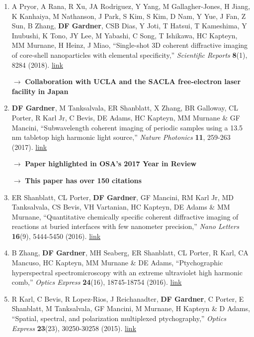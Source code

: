 \documentclass[letterpaper,12pt]{article}
\begin{document}
\begin{enumerate}[leftmargin=*]
	\item A Pryor, A Rana, R Xu, JA Rodriguez, Y Yang, M Gallagher-Jones, H Jiang, K Kanhaiya, M Nathanson, J Park, S Kim, S Kim, D Nam, Y Yue, J Fan, Z Sun, B Zhang, \textbf{DF Gardner}, CSB Dias, Y Joti, T Hatsui, T Kameshima, Y Inubushi, K Tono, JY Lee, M Yabashi, C Song, T Ishikawa, HC Kapteyn, MM Murnane, H Heinz, J Miao, ``Single-shot 3D coherent diffractive imaging of core-shell nanoparticles with elemental specificity,'' \emph{Scientific Reports} \textbf{8}(1), 8284 (2018). \href{https://doi.org/10.1038/s41598-018-26182-1}{link}
	
	\quad $\rightarrow$ \textbf{Collaboration with UCLA and the SACLA free-electron laser facility in Japan}
	
	\item \textbf{DF Gardner}, M Tanksalvala, ER Shanblatt, X Zhang, BR Galloway, CL Porter, R Karl Jr, C Bevis, DE Adams, HC Kapteyn, MM Murnane \& GF Mancini, ``Subwavelength coherent imaging of periodic samples using a 13.5 nm tabletop high harmonic light source,'' \emph{Nature Photonics} \textbf{11}, 259-263 (2017). \href{https://doi.org/10.1038/nphoton.2017.33}{link}
	
	\quad $\rightarrow$ \textbf{Paper highlighted in OSA's 2017 Year in Review}
	
	\quad $\rightarrow$ \textbf{This paper has over 150 citations}
	
	\item ER Shanblatt, CL Porter, \textbf{DF Gardner}, GF Mancini, RM Karl Jr, MD Tanksalvala, CS Bevis, VH Vartanian, HC Kapteyn, DE Adams \& MM Murnane, ``Quantitative chemically specific coherent diffractive imaging of reactions at buried interfaces with few nanometer precision,'' \emph{Nano Letters} \textbf{16}(9), 5444-5450 (2016). \href{https://doi.org/10.1021/acs.nanolett.6b01864}{link}
	
	\item B Zhang, \textbf{DF Gardner}, MH Seaberg, ER Shanblatt, CL Porter, R Karl, CA Mancuso, HC Kapteyn, MM Murnane \& DE Adams, ``Ptychographic hyperspectral spectromicroscopy with an extreme ultraviolet high harmonic comb,''  \emph{Optics Express} \textbf{24}(16), 18745-18754 (2016). \href{https://doi.org/10.1364/OE.24.018745}{link}
	
	\item R Karl, C Bevis, R Lopez-Rios, J Reichanadter, \textbf{DF Gardner}, C Porter, E Shanblatt, M Tanksalvala, GF Mancini, M Murnane, H Kapteyn \& D Adams, ``Spatial, spectral, and polarization multiplexed ptychography,'' \emph{Optics Express} \textbf{23}(23), 30250-30258 (2015). \href{https://doi.org/10.1364/OE.23.030250}{link}
	

\end{enumerate}
\end{document}
